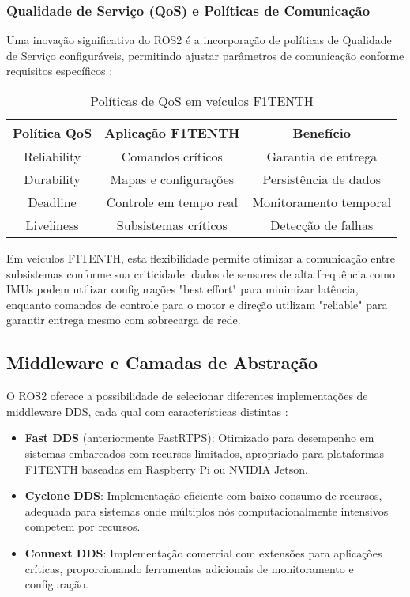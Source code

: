 \subsubsection{Qualidade de Serviço (QoS) e Políticas de Comunicação}

Uma inovação significativa do ROS2 é a incorporação de políticas de Qualidade
de Serviço configuráveis, permitindo ajustar parâmetros de comunicação conforme
requisitos específicos \cite{gutierrez2019time}:

\begin{table}[h]
    \centering
    \begin{tabular}{|c|c|c|}
        \hline
        \textbf{Política QoS} & \textbf{Aplicação F1TENTH} & \textbf{Benefício}     \\
        \hline
        Reliability           & Comandos críticos          & Garantia de entrega    \\
        \hline
        Durability            & Mapas e configurações      & Persistência de dados  \\
        \hline
        Deadline              & Controle em tempo real     & Monitoramento temporal \\
        \hline
        Liveliness            & Subsistemas críticos       & Detecção de falhas     \\
        \hline
    \end{tabular}
    \caption{Políticas de QoS em veículos F1TENTH}
    \label{tab:qos_policies}
\end{table}

Em veículos F1TENTH, esta flexibilidade permite otimizar a comunicação entre
subsistemas conforme sua criticidade: dados de sensores de alta frequência como
IMUs podem utilizar configurações "best effort" para minimizar latência,
enquanto comandos de controle para o motor e direção utilizam "reliable" para
garantir entrega mesmo com sobrecarga de rede.

\subsection{Middleware e Camadas de Abstração}

O ROS2 oferece a possibilidade de selecionar diferentes implementações de
middleware DDS, cada qual com características distintas
\cite{maruyama2016exploring}:

\begin{itemize}
    \item \textbf{Fast DDS} (anteriormente FastRTPS): Otimizado para desempenho em sistemas embarcados com recursos limitados, apropriado para plataformas F1TENTH baseadas em Raspberry Pi ou NVIDIA Jetson.
    \item \textbf{Cyclone DDS}: Implementação eficiente com baixo consumo de recursos, adequada para sistemas onde múltiplos nós computacionalmente intensivos competem por recursos.
    \item \textbf{Connext DDS}: Implementação comercial com extensões para aplicações críticas, proporcionando ferramentas adicionais de monitoramento e configuração.
\end{itemize}

